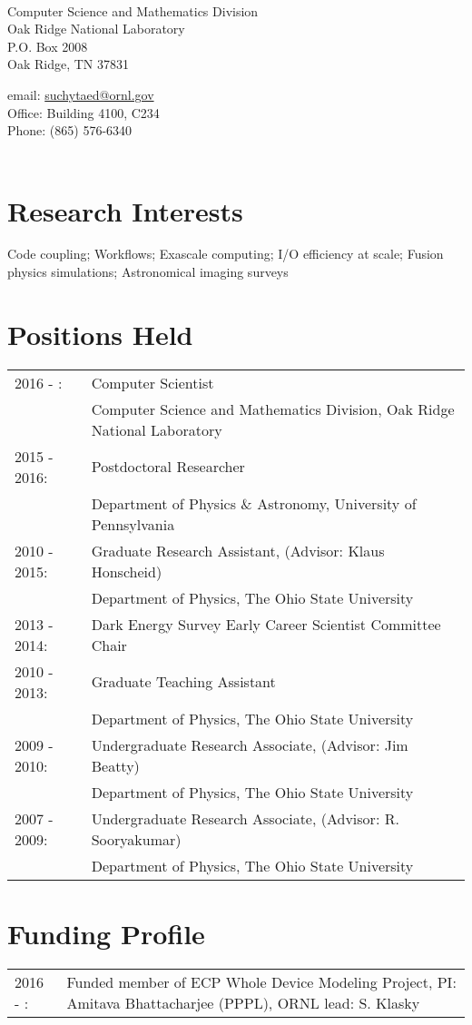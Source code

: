 \documentclass[12pt,a4paper,sans]{moderncv}	%
\makeatletter
\newcommand{\suchytatitle}{%
\begin{center}
\namestyle{Eric~Suchyta}\titlestyle{~|~Resume} \\
\end{center}
%
\begin{minipage}[!t]{0.49\textwidth}
	Computer Science and Mathematics Division \\
	Oak Ridge National Laboratory \\
	P.O. Box 2008 \\
	Oak Ridge, TN 37831 \\
\end{minipage}
%
\begin{minipage}[!t]{0.50\textwidth}
email: \href{mailto:suchytaed@ornl.gov}{suchytaed@ornl.gov}\\
Office: Building 4100, C234 \\
Phone: (865) 576-6340 \\ \\
\end{minipage}
}
\makeatother
\begin{document}
\suchytatitle{}



\section{Research Interests}
Code coupling;
Workflows;
Exascale computing;
I/O efficiency at scale;
Fusion physics simulations;
Astronomical imaging surveys


\newcommand{\tsp}{\\[0.5em]}
\section{Positions Held}
\begin{tabularx}{\linewidth}{l X}
2016 - : & Computer Scientist \\ & Computer Science and Mathematics Division, Oak Ridge National Laboratory \tsp
2015 - 2016: & Postdoctoral Researcher \\ & Department of Physics \& Astronomy, University of Pennsylvania \tsp
2010 - 2015: & Graduate Research Assistant, (Advisor: Klaus Honscheid) \\& Department of Physics, The Ohio State University \tsp
2013 - 2014: & Dark Energy Survey Early Career Scientist Committee Chair \tsp
2010 - 2013: & Graduate Teaching Assistant \\& Department of Physics, The Ohio State University \tsp
2009 - 2010: & Undergraduate Research Associate, (Advisor: Jim Beatty) \\& Department of Physics, The Ohio State University \tsp
2007 - 2009: & Undergraduate Research Associate, (Advisor: R. Sooryakumar) \\& Department of Physics, The Ohio State University \tsp
\end{tabularx}

\section{Funding Profile}
\begin{tabularx}{\linewidth}{l X}
2016 - : & Funded member of ECP Whole Device Modeling Project, PI: Amitava Bhattacharjee (PPPL), ORNL lead: S. Klasky \tsp
\end{tabularx}
\end{document}

